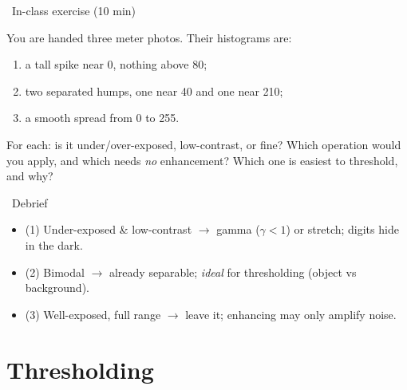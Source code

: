 \documentclass[10pt,aspectratio=169]{beamer}
\begin{document}
\begin{frame}{\faPen~In-class exercise (10 min)}
  \begin{infobox}
  \end{infobox}
  You are handed three meter photos. Their histograms are:
  \begin{enumerate}
    \item a tall spike near 0, nothing above 80;
    \item two separated humps, one near 40 and one near 210;
    \item a smooth spread from 0 to 255.
  \end{enumerate}
  For each: is it under/over-exposed, low-contrast, or fine? Which operation would you apply,
  and which needs \emph{no} enhancement? Which one is easiest to threshold, and why?
\end{frame}

\begin{frame}{\faPen~Debrief}
  \begin{itemize}
    \item (1) Under-exposed \& low-contrast $\rightarrow$ gamma ($\gamma<1$) or stretch; digits hide in the dark.
    \item (2) Bimodal $\rightarrow$ already separable; \emph{ideal} for thresholding (object vs background).
    \item (3) Well-exposed, full range $\rightarrow$ leave it; enhancing may only amplify noise.
  \end{itemize}
\end{frame}

\section{Thresholding}
\end{document}
